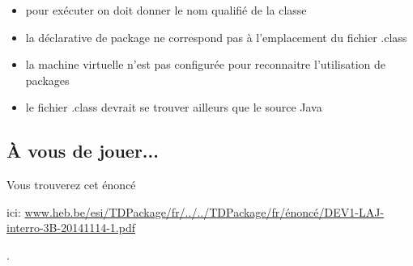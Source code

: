 \documentclass[11pt,a4paper]{article}
\begin{document}
            \par
        
            \begin{itemize} 
        
            \item[ \ding{"6D} ] pour ex\'ecuter on doit donner le nom qualifi\'e de la classe
        
            \item[ \ding{"6D} ] la d\'eclarative de package ne correspond pas \`a l'emplacement du fichier .class
        
            \item[ \ding{"6D} ] la machine virtuelle n'est pas configur\'ee pour reconnaitre l'utilisation de packages
        
            \item[ \ding{"6D} ] le fichier .class devrait se trouver ailleurs que le source Java
        
            \end{itemize} 
        \subsection{\`A vous de jouer...}
        Vous trouverez cet \'enonc\'e 
					\par
				ici: \url{www.heb.be/esi/TDPackage/fr/../../TDPackage/fr/énoncé/DEV1-LAJ-interro-3B-20141114-1.pdf} 
					\par
				.
      
				
\end{document}

